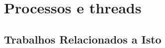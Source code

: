 \chapter{Processos e threads}\label{cap:ProcessosThreads}



\section{Trabalhos Relacionados a Isto}\label{sec:primTrab}

